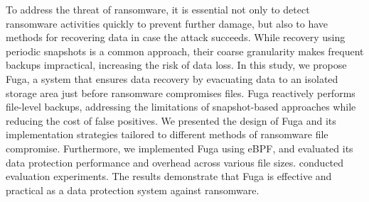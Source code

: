 To address the threat of ransomware, it is essential not only to detect ransomware activities quickly to prevent further damage,
but also to have methods for recovering data in case the attack succeeds.
While recovery using periodic snapshots is a common approach, their coarse granularity makes frequent backups impractical, increasing the risk of data loss.
In this study, we propose Fuga, a system that ensures data recovery by evacuating data to an isolated storage area just before ransomware compromises files.
Fuga reactively performs file-level backups, addressing the limitations of snapshot-based approaches while reducing the cost of false positives.
We presented the design of Fuga and its implementation strategies tailored to different methods of ransomware file compromise.
Furthermore, we implemented Fuga using eBPF, and
evaluated its data protection performance and overhead across various file sizes.
conducted evaluation experiments.
The results demonstrate that Fuga is effective and practical as a data protection system against ransomware.
